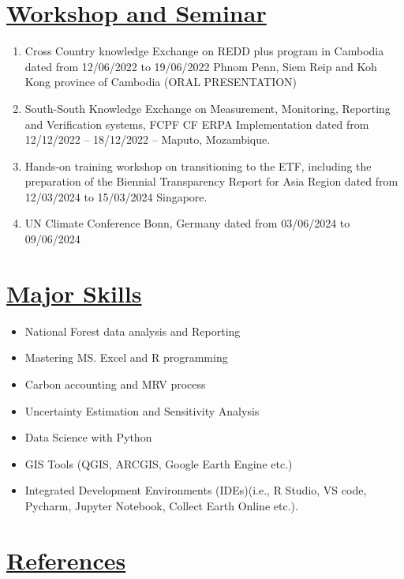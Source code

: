 \documentclass[
]{article}
\providecommand{\tightlist}{%
  \setlength{\itemsep}{0pt}\setlength{\parskip}{0pt}}
\begin{document}
\section{\texorpdfstring{\underline{Workshop and Seminar}}{}}\label{section-6}

\begin{enumerate}
\def\labelenumi{\arabic{enumi}.}
\tightlist
\item
  Cross Country knowledge Exchange on REDD plus program in Cambodia
  dated from 12/06/2022 to 19/06/2022 Phnom Penn, Siem Reip and Koh Kong
  province of Cambodia (ORAL PRESENTATION)
\item
  South-South Knowledge Exchange on Measurement, Monitoring, Reporting
  and Verification systems, FCPF CF ERPA Implementation dated from
  12/12/2022 -- 18/12/2022 -- Maputo, Mozambique.
\item
  Hands-on training workshop on transitioning to the ETF, including the
  preparation of the Biennial Transparency Report for Asia Region dated
  from 12/03/2024 to 15/03/2024 Singapore.
\item
  UN Climate Conference Bonn, Germany dated from 03/06/2024 to
  09/06/2024
\end{enumerate}

\section{\texorpdfstring{\underline{Major Skills}}{}}\label{section-7}

\begin{itemize}
\tightlist
\item
  National Forest data analysis and Reporting
\item
  Mastering MS. Excel and R programming
\item
  Carbon accounting and MRV process
\item
  Uncertainty Estimation and Sensitivity Analysis
\item
  Data Science with Python
\item
  GIS Tools (QGIS, ARCGIS, Google Earth Engine etc.)
\item
  Integrated Development Environments (IDEs)(i.e., R Studio, VS code,
  Pycharm, Jupyter Notebook, Collect Earth Online etc.).
\end{itemize}

\section{\texorpdfstring{\underline{References}}{}}\label{section-8}
\end{document}
